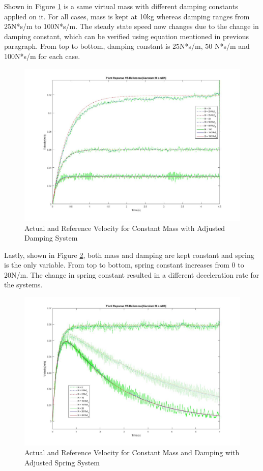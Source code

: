 Shown in Figure \ref{fig:BChange} is a same virtual mass with different damping constants applied on it. For all cases, mass is kept at 10kg whereas damping ranges from 25N*s/m to 100N*s/m. The steady state speed now changes due to the change in damping constant, which can be verified using equation mentioned in previous paragraph. From top to bottom, damping constant is 25N*s/m, 50 N*s/m and 100N*s/m for each case. 
\begin{figure}[H]
\centering
\includegraphics[width=1\linewidth]{Images/BChange}
\caption{Actual and Reference Velocity for Constant Mass with Adjusted Damping System}
\label{fig:BChange}
\end{figure}

Lastly, shown in Figure \ref{fig:KChange}, both mass and damping are kept constant and spring is the only variable. From top to bottom, spring constant increases from 0 to 20N/m. The change in spring constant resulted in a different deceleration rate for the systems. 
\begin{figure}[H]
\centering
\includegraphics[width=1\linewidth]{Images/KChange}
\caption{Actual and Reference Velocity for Constant Mass and Damping with Adjusted Spring System}
\label{fig:KChange}
\end{figure}

